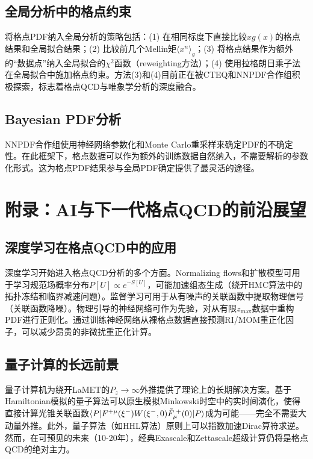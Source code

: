 \documentclass[11pt,a4paper]{ctexart}
\begin{document}
\subsection{全局分析中的格点约束}

将格点PDF纳入全局分析的策略包括：(1) 在相同标度下直接比较$x g(x)$的格点结果和全局拟合结果；(2) 比较前几个Mellin矩$\langle x^n \rangle_g$；(3) 将格点结果作为额外的``数据点''纳入全局拟合的$\chi^2$函数（reweighting方法）；(4) 使用拉格朗日乘子法在全局拟合中施加格点约束。方法(3)和(4)目前正在被CTEQ和NNPDF合作组积极探索，标志着格点QCD与唯象学分析的深度融合。

\subsection{Bayesian PDF分析}

NNPDF合作组使用神经网络参数化和Monte Carlo重采样来确定PDF的不确定性。在此框架下，格点数据可以作为额外的训练数据自然纳入，不需要解析的参数化形式。这为格点PDF结果参与全局PDF确定提供了最灵活的途径。

\section{附录：AI与下一代格点QCD的前沿展望}

\subsection{深度学习在格点QCD中的应用}

深度学习开始进入格点QCD分析的多个方面。Normalizing flows和扩散模型可用于学习规范场概率分布$P[U] \propto e^{-S[U]}$，可能加速组态生成（绕开HMC算法中的拓扑冻结和临界减速问题）。监督学习可用于从有噪声的关联函数中提取物理信号（关联函数降噪）。物理引导的神经网络可作为先验，对从有限$z_{\text{max}}$数据中重构PDF进行正则化。通过训练神经网络从裸格点数据直接预测RI/MOM重正化因子，可以减少昂贵的非微扰重正化计算。

\subsection{量子计算的长远前景}

量子计算机为绕开LaMET的$P_z \to \infty$外推提供了理论上的长期解决方案。基于Hamiltonian模拟的量子算法可以原生模拟Minkowski时空中的实时间演化，使得直接计算光锥关联函数$\braket{P | F^{+\mu}(\xi^-) W(\xi^-,0) \tilde{F}_\mu^{\;+}(0) | P}$成为可能——完全不需要大动量外推。此外，量子算法（如HHL算法）原则上可以指数加速Dirac算符求逆。然而，在可预见的未来（10-20年），经典Exascale和Zettascale超级计算仍将是格点QCD的绝对主力。
\end{document}

